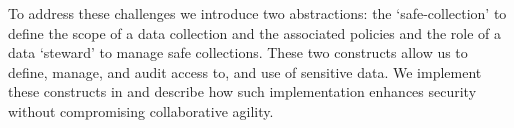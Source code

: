 To address these challenges we introduce two abstractions:
the `safe-collection' to define the scope of a data collection
and the associated policies and the role of a data `steward'
to manage safe collections. These two constructs allow us
to define, manage, and audit access to, and use of
sensitive data.  We implement these constructs in \NAME and
describe how such implementation enhances security without compromising collaborative agility.


%
